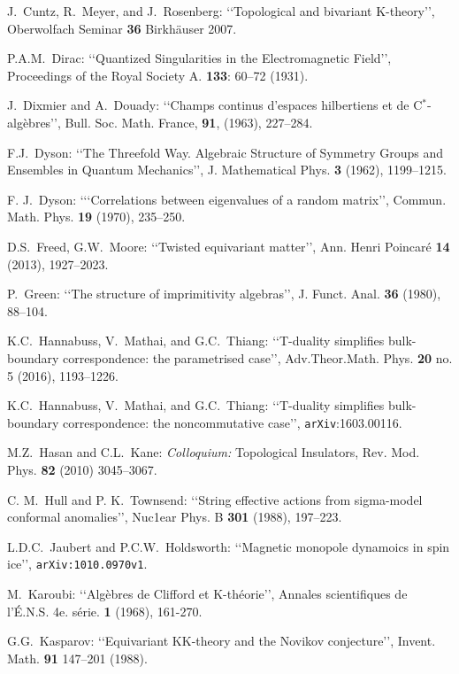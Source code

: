 \documentclass[11pt]{article}
\begin{document}
\begin{thebibliography}{99}
J.\  Cuntz, R.\  Meyer, and J.\  Rosenberg: \lq\lq Topological and bivariant K-theory\rq\rq, Oberwolfach Seminar {\bf 36} Birkh\"auser 2007.

 P.A.M.\ Dirac:  \lq\lq Quantized Singularities in the Electromagnetic Field\rq\rq, Proceedings of the Royal Society A. {\bf 133}: 60--72 (1931). 

J.\  Dixmier and A.\  Douady:  \lq\lq Champs continus d'espaces hilbertiens et de C$^*$-alg\`ebres\rq\rq,
Bull. Soc. Math. France, {\bf 91}, (1963), 227--284.

F.J.\  Dyson: \lq\lq The Threefold Way. Algebraic Structure of Symmetry Groups and Ensembles in Quantum Mechanics\rq\rq,
J. Mathematical Phys. {\bf 3} (1962), 1199--1215.

F. J.\  Dyson: \lq\lq ‘Correlations between eigenvalues of a random matrix\rq\rq, Commun. Math. Phys. {\bf 19} (1970), 235--250.

D.S.\ Freed, G.W.\  Moore: \lq\lq Twisted equivariant matter\rq\rq,  Ann. Henri Poincar{\'e} {\bf 14} (2013), 1927--2023. 

P.\ Green: \lq\lq The structure of imprimitivity algebras\rq\rq, J. Funct. Anal. {\bf 36} (1980), 88--104.

K.C.\ Hannabuss, V.\ Mathai, and  G.C.\ Thiang: \lq\lq T-duality simplifies bulk-boundary correspondence: the parametrised case\rq\rq,
Adv.Theor.Math. Phys. {\bf 20} no. 5 (2016), 1193--1226.

K.C.\ Hannabuss, V.\ Mathai, and  G.C.\ Thiang: \lq\lq T-duality simplifies bulk-boundary correspondence: the noncommutative case\rq\rq,
{\tt arXiv}:1603.00116.

M.Z.\  Hasan and C.L.\  Kane: {\it Colloquium:} Topological Insulators, Rev. Mod. Phys. {\bf 82}  (2010) 3045--3067.

C. M.\  Hull and P. K.\  Townsend:  \lq\lq String effective actions from sigma-model conformal anomalies\rq\rq, Nuc1ear Phys. B {\bf 301} (1988), 197--223.

L.D.C.\ Jaubert and P.C.W.\ Holdsworth: \lq\lq Magnetic monopole dynamoics in spin ice\rq\rq, {\tt arXiv:1010.0970v1}.

M.\  Karoubi: \lq\lq Alg\`ebres de Clifford et K-th\'eorie\rq\rq, Annales scientifiques de l'\'E.N.S. 4e. s\'erie. {\bf 1} (1968), 161-270.

G.G.\ Kasparov: \lq\lq Equivariant KK-theory and the Novikov conjecture\rq\rq, Invent. Math. {\bf 91} 147--201 (1988).


\end{thebibliography}
\end{document}
